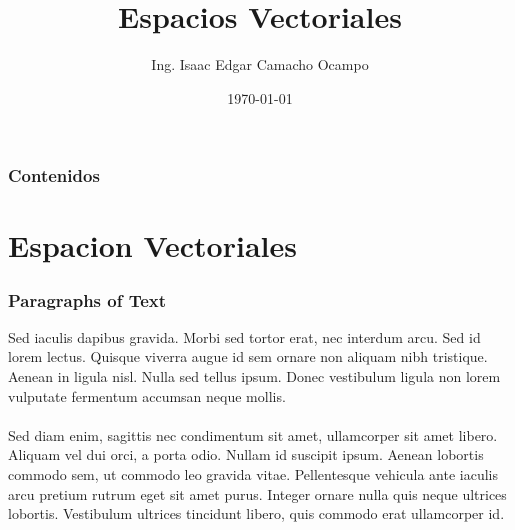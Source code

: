 \documentclass{beamer}
\title[Título]{Espacios Vectoriales} %
\author{Ing. Isaac Edgar Camacho Ocampo } %
\institute[UBA] %
{
  Universidad de Buenos aires \\ %
  \medskip
  \textit{autor@ugr.correo.es} %
}
\date{\today} %
\begin{document}
\begin{frame}
\titlepage %
\end{frame}

\begin{frame}
  \frametitle{Contenidos} %
  \tableofcontents
\end{frame}




\section{Espacion Vectoriales} %


\begin{frame}
\frametitle{Paragraphs of Text}
Sed iaculis dapibus gravida. Morbi sed tortor erat, nec interdum arcu. Sed id lorem lectus. Quisque viverra augue id sem ornare non aliquam nibh tristique. Aenean in ligula nisl. Nulla sed tellus ipsum. Donec vestibulum ligula non lorem vulputate fermentum accumsan neque mollis.\\~\\

Sed diam enim, sagittis nec condimentum sit amet, ullamcorper sit amet libero. Aliquam vel dui orci, a porta odio. Nullam id suscipit ipsum. Aenean lobortis commodo sem, ut commodo leo gravida vitae. Pellentesque vehicula ante iaculis arcu pretium rutrum eget sit amet purus. Integer ornare nulla quis neque ultrices lobortis. Vestibulum ultrices tincidunt libero, quis commodo erat ullamcorper id.
\end{frame}
\end{document}
